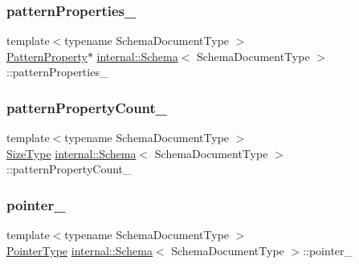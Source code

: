 \mbox{\label{classinternal_1_1Schema_a9d9511472763ee8bff186d524e5f74a8}} 
\subsubsection{\texorpdfstring{pattern\+Properties\+\_\+}{patternProperties\_}}
{\footnotesize\ttfamily template$<$typename Schema\+Document\+Type $>$ \\
\hyperlink{structinternal_1_1Schema_1_1PatternProperty}{Pattern\+Property}$\ast$ \hyperlink{classinternal_1_1Schema}{internal\+::\+Schema}$<$ Schema\+Document\+Type $>$\+::pattern\+Properties\+\_\+\hspace{0.3cm}{\ttfamily [private]}}

\mbox{\label{classinternal_1_1Schema_ad0deaa0bc5e23815d1e5d937694d110a}} 
\subsubsection{\texorpdfstring{pattern\+Property\+Count\+\_\+}{patternPropertyCount\_}}
{\footnotesize\ttfamily template$<$typename Schema\+Document\+Type $>$ \\
\hyperlink{rapidjson_8h_a5ed6e6e67250fadbd041127e6386dcb5}{Size\+Type} \hyperlink{classinternal_1_1Schema}{internal\+::\+Schema}$<$ Schema\+Document\+Type $>$\+::pattern\+Property\+Count\+\_\+\hspace{0.3cm}{\ttfamily [private]}}

\mbox{\label{classinternal_1_1Schema_abfed25bfe24ed5e6d60f8dd63b8d0617}} 
\subsubsection{\texorpdfstring{pointer\+\_\+}{pointer\_}}
{\footnotesize\ttfamily template$<$typename Schema\+Document\+Type $>$ \\
\hyperlink{classinternal_1_1Schema_a13d7dbba6e4a77b10862546777c5aae8}{Pointer\+Type} \hyperlink{classinternal_1_1Schema}{internal\+::\+Schema}$<$ Schema\+Document\+Type $>$\+::pointer\+\_\+\hspace{0.3cm}{\ttfamily [private]}}

